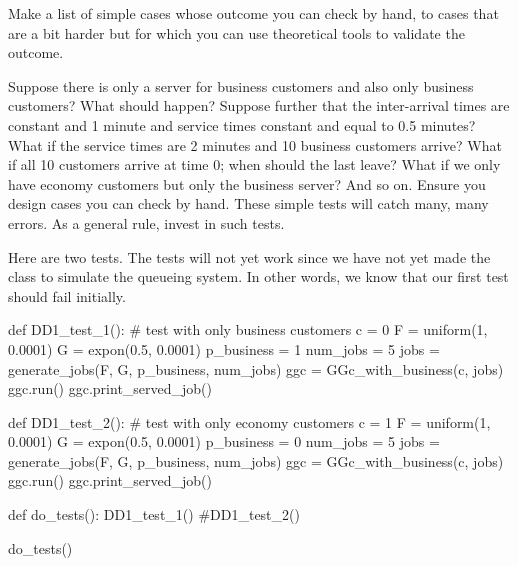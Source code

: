 \begin{exercise}
  Make a list of  simple cases whose outcome you can check by hand, to cases that are a bit harder but for which  you can use theoretical tools to validate the outcome.
\begin{hint}
    Suppose there is only a server for business customers and also only business customers?
    What should happen?
    Suppose further that the inter-arrival times are constant and 1 minute and service times constant and equal to 0.5 minutes?
    What if the service times are 2 minutes and 10 business customers arrive?
    What if all 10 customers arrive at time 0; when should the last leave?
    What if we only have economy customers but only the business server?
    And so on.
    Ensure you design cases you can check by hand.
    These simple tests will catch many, many errors.
    As a general rule, invest in such tests.
\end{hint}


\begin{solution}
    Here are two tests.
    The tests will not yet work since we have not yet made the class to simulate the queueing system.
    In other words, we know that our first test should fail initially.

    \begin{pynotangle}
def DD1_test_1():
    # test with only business customers
    c = 0
    F = uniform(1, 0.0001)
    G = expon(0.5, 0.0001)
    p_business = 1
    num_jobs = 5
    jobs = generate_jobs(F, G, p_business, num_jobs)
    ggc = GGc_with_business(c, jobs)
    ggc.run()
    ggc.print_served_job()


def DD1_test_2():
    # test with only economy customers
    c = 1
    F = uniform(1, 0.0001)
    G = expon(0.5, 0.0001)
    p_business = 0
    num_jobs = 5
    jobs = generate_jobs(F, G, p_business, num_jobs)
    ggc = GGc_with_business(c, jobs)
    ggc.run()
    ggc.print_served_job()

def do_tests():
    DD1_test_1()
    #DD1_test_2()

do_tests()
    \end{pynotangle}

  \end{solution}

\end{exercise}


